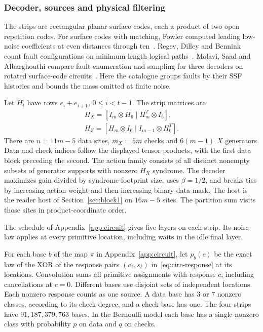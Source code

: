 \documentclass[10pt,twocolumn]{article}
\theoremstyle{definition}
\begin{document}
\subsubsection{Decoder, sources and physical filtering}
The strips are rectangular planar surface codes, each a product of two
open repetition codes. For surface codes with matching, Fowler computed
leading low-noise coefficients at even distances through ten~\cite[Table~I]{Fowler13}.
Regev, Dilley and Bennink count fault configurations on minimum-length
logical paths~\cite[Sec.~II]{RDB26}. Molavi, Saad and Albarghouthi compare
fault enumeration and sampling for three decoders on rotated
surface-code circuits~\cite[Sec.~8]{MSA26}. Here the catalogue groups
faults by their SSF histories and bounds the mass omitted at finite noise.

Let $H_t$ have rows $e_i+e_{i+1}$, $0\le i<t-1$. The strip matrices are
\[
\begin{gathered}
 H_X=[I_m\otimes H_6\mid H_m^T\otimes I_5],\\
 H_Z=[H_m\otimes I_6\mid I_{m-1}\otimes H_6^T].
\end{gathered}
\]
There are $n=11m-5$ data sites, $m_X=5m$ checks and $6(m-1)$
$X$ generators. Data and check indices follow the displayed tensor
products, with the first data block preceding the second. The action
family consists of all distinct nonempty subsets of generator supports
with nonzero $H_X$ syndrome. The decoder maximizes gain divided by
syndrome-footprint size, uses $\beta=1/2$, and breaks ties by increasing
action weight and then increasing binary data mask. The host is the
reader host of Section~\ref{sec:block1} on $16m-5$ sites. The partition
sum visits those sites in product-coordinate order.

The schedule of Appendix~\ref{app:circuit} gives five layers on each
strip. Its noise law applies at every primitive location, including
waits in the idle final layer.

For each base $b$ of the map $\pi$ in Appendix~\ref{app:circuit}, let
$p_b(c)$ be the exact law of the XOR of the response pairs
$(e_\ell,s_\ell)$ in~\eqref{eq:circ-response} at its locations.
Convolution sums all primitive assignments with response $c$,
including cancellations at $c=0$. Different bases use disjoint sets
of independent locations. Each nonzero response counts as one source.
A data base has $3$ or $7$ nonzero classes, according to its check
degree, and a check base has one. The four strips have $91,187,379,763$
bases. In the Bernoulli model each base has a single nonzero class
with probability $p$ on data and $q$ on checks.
\end{document}
